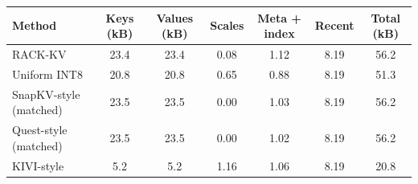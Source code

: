 \begin{threeparttable}
\begin{tabular}{@{}l
S[table-format=2.1]
S[table-format=2.1]
S[table-format=1.2]
S[table-format=1.2]
S[table-format=1.2]
S[table-format=2.1]@{}}
\toprule
Method & {Keys (kB)} & {Values (kB)} & {Scales} & {Meta + index} & {Recent} & {Total (kB)} \\
\midrule
RACK-KV & 23.4 & 23.4 & 0.08 & 1.12 & 8.19 & 56.2 \\
Uniform INT8 & 20.8 & 20.8 & 0.65 & 0.88 & 8.19 & 51.3 \\
SnapKV-style (matched) & 23.5 & 23.5 & 0.00 & 1.03 & 8.19 & 56.2 \\
Quest-style (matched) & 23.5 & 23.5 & 0.00 & 1.02 & 8.19 & 56.2 \\
KIVI-style & 5.2 & 5.2 & 1.16 & 1.06 & 8.19 & 20.8 \\
\bottomrule
\end{tabular}
\end{threeparttable}
